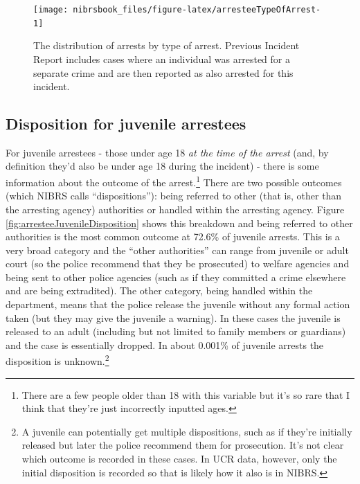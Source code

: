 \documentclass[
  12pt,
  openany]{book}
\begin{document}
\begin{figure}

{\centering \texttt{[image: nibrsbook\_files/figure-latex/arresteeTypeOfArrest-1]} 

}

\caption{The distribution of arrests by type of arrest. Previous Incident Report includes cases where an individual was arrested for a separate crime and are then reported as also arrested for this incident.}\label{fig:arresteeTypeOfArrest}
\end{figure}

\hypertarget{disposition-for-juvenile-arrestees}{%
\subsection{Disposition for juvenile arrestees}\label{disposition-for-juvenile-arrestees}}

For juvenile arrestees - those under age 18 \emph{at the time of the arrest} (and, by definition they'd also be under age 18 during the incident) - there is some information about the outcome of the arrest.\footnote{There are a few people older than 18 with this variable but it's so rare that I think that they're just incorrectly inputted ages.} There are two possible outcomes (which NIBRS calls ``dispositions''): being referred to other (that is, other than the arresting agency) authorities or handled within the arresting agency. Figure \ref{fig:arresteeJuvenileDisposition} shows this breakdown and being referred to other authorities is the most common outcome at 72.6\% of juvenile arrests. This is a very broad category and the ``other authorities'' can range from juvenile or adult court (so the police recommend that they be prosecuted) to welfare agencies and being sent to other police agencies (such as if they committed a crime elsewhere and are being extradited). The other category, being handled within the department, means that the police release the juvenile without any formal action taken (but they may give the juvenile a warning). In these cases the juvenile is released to an adult (including but not limited to family members or guardians) and the case is essentially dropped. In about 0.001\% of juvenile arrests the disposition is unknown.\footnote{A juvenile can potentially get multiple dispositions, such as if they're initially released but later the police recommend them for prosecution. It's not clear which outcome is recorded in these cases. In UCR data, however, only the initial disposition is recorded so that is likely how it also is in NIBRS.}
\end{document}
